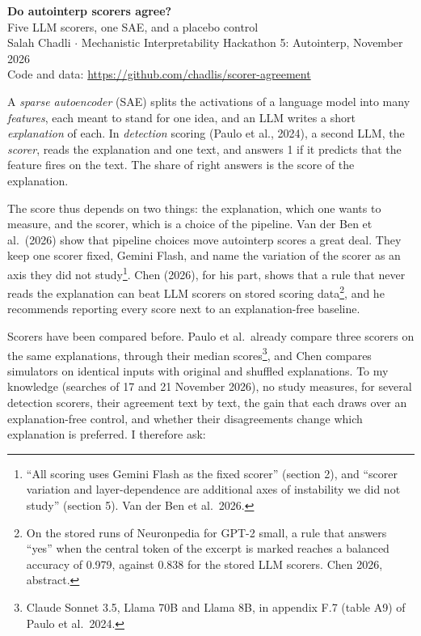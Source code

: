 \documentclass[10pt]{article}
\makeatletter
\renewcommand\section{\@startsection{section}{1}{\z@}{-1.8ex}{0.8ex}{\normalfont\large\bfseries}}
\makeatother
\begin{document}
\begin{center}
{\Large\bfseries Do autointerp scorers agree?}\\[3pt]
{\large Five LLM scorers, one SAE, and a placebo control}\\[5pt]
{\small Salah Chadli $\cdot$ Mechanistic Interpretability Hackathon 5: Autointerp, November 2026}\\[1pt]
{\small Code and data: \url{https://github.com/chadlis/scorer-agreement}}
\end{center}

\section{Question and motivation}

A \emph{sparse autoencoder} (SAE) splits the activations of a language model into many
\emph{features}, each meant to stand for one idea, and an LLM writes a short
\emph{explanation} of each. In \emph{detection} scoring (Paulo et al., 2024), a second
LLM, the \emph{scorer}, reads the explanation and one text, and answers 1 if it predicts
that the feature fires on the text. The share of right answers is the score of the
explanation.

The score thus depends on two things: the explanation, which one wants to measure, and
the scorer, which is a choice of the pipeline. Van der Ben et al.\ (2026) show that
pipeline choices move autointerp scores a great deal. They keep one scorer fixed, Gemini
Flash, and name the variation of the scorer as an axis they did not
study\footnote{``All scoring uses Gemini Flash as the fixed scorer'' (section 2), and
``scorer variation and layer-dependence are additional axes of instability we did not
study'' (section 5). Van der Ben et al.\ 2026.}. Chen (2026), for his part, shows that
a rule that never reads the explanation can beat LLM scorers on stored scoring
data\footnote{On the stored runs of Neuronpedia for GPT-2 small, a rule that answers
``yes'' when the central token of the excerpt is marked reaches a balanced accuracy of
0.979, against 0.838 for the stored LLM scorers. Chen 2026, abstract.}, and he
recommends reporting every score next to an explanation-free baseline.

Scorers have been compared before. Paulo et al.\ already compare three scorers on the
same explanations, through their median scores\footnote{Claude Sonnet 3.5, Llama 70B and
Llama 8B, in appendix F.7 (table A9) of Paulo et al.\ 2024.}, and Chen compares
simulators on identical inputs with original and shuffled explanations. To my knowledge
(searches of 17 and 21 November 2026), no study measures, for several detection scorers,
their agreement text by text, the gain that each draws over an explanation-free control,
and whether their disagreements change which explanation is preferred. I therefore ask:
\end{document}
